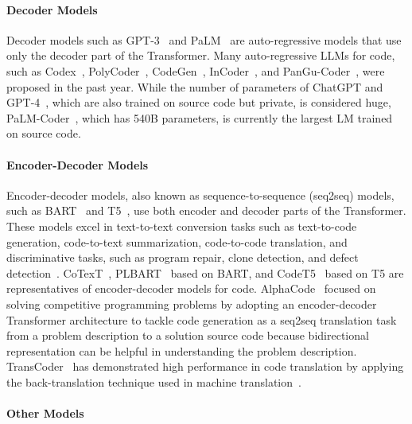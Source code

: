 \documentclass{article}
\begin{document}
\paragraph{Decoder Models}

Decoder models such as GPT-3~\citep{brown2020gpt3} and PaLM~\citep{chowdhery2022palm} are auto-regressive models that use only the decoder part of the Transformer.
Many auto-regressive LLMs for code, such as Codex~\citep{chen2021codex}, PolyCoder~\citep{xu2022polycoder}, CodeGen~\citep{nijkamp2022codegen}, InCoder~\citep{fried2022incoder}, and PanGu-Coder~\citep{christopoulou2022pangucoder}, were proposed in the past year.
While the number of parameters of ChatGPT and GPT-4~\citep{openai2023gpt-4}, which are also trained on source code but private, is considered huge, PaLM-Coder~\citep{chowdhery2022palm}, which has 540B parameters, is currently the largest LM trained on source code.



\paragraph{Encoder-Decoder Models}

Encoder-decoder models, also known as sequence-to-sequence (seq2seq) models, such as BART~\citep{lewis2020bart} and T5~\citep{raffel2020t5}, use both encoder and decoder parts of the Transformer.
These models excel in text-to-text conversion tasks such as text-to-code generation, code-to-text summarization, code-to-code translation, and discriminative tasks, such as program repair, clone detection, and defect detection~\citep{mastropaolo2021t5}.
CoTexT~\citep{phan2021cotext}, PLBART~\citep{ahmad2021plbart} based on BART, and CodeT5~\citep{wang2021codet5} based on T5 are representatives of encoder-decoder models for code.
AlphaCode~\citep{li2022alphacode} focused on solving competitive programming problems by adopting an encoder-decoder Transformer architecture to tackle code generation as a seq2seq translation task from a problem description to a solution source code because bidirectional representation can be helpful in understanding the problem description.
TransCoder~\citep{roziere2020transcoder} has demonstrated high performance in code translation by applying the back-translation technique used in machine translation~\citep{sennrich2016backtranslation}.



\paragraph{Other Models}
\end{document}
